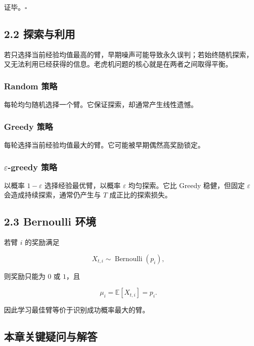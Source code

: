 \documentclass[
  11pt,
  a4paper,
]{ctexart}
\begin{document}
证毕。\(\square\)

\subsection{2.2 探索与利用}\label{ux63a2ux7d22ux4e0eux5229ux7528}

若只选择当前经验均值最高的臂，早期噪声可能导致永久误判；若始终随机探索，又无法利用已经获得的信息。老虎机问题的核心就是在两者之间取得平衡。

\subsubsection{Random 策略}\label{random-ux7b56ux7565}

每轮均匀随机选择一个臂。它保证探索，却通常产生线性遗憾。

\subsubsection{Greedy 策略}\label{greedy-ux7b56ux7565}

每轮选择当前经验均值最大的臂。它可能被早期偶然高奖励锁定。

\subsubsection{\texorpdfstring{\(\varepsilon\)-greedy
策略}{\textbackslash varepsilon-greedy 策略}}\label{varepsilon-greedy-ux7b56ux7565}

以概率 \(1-\varepsilon\) 选择经验最优臂，以概率 \(\varepsilon\)
均匀探索。它比 Greedy 稳健，但固定 \(\varepsilon\)
会造成持续探索，通常仍产生与 \(T\) 成正比的探索损失。

\subsection{2.3 Bernoulli 环境}\label{bernoulli-ux73afux5883}

若臂 \(i\) 的奖励满足

\[
X_{t,i}\sim\operatorname{Bernoulli}(p_i),
\]

则奖励只能为 \(0\) 或 \(1\)，且

\[
\mu_i=\mathbb E[X_{t,i}]=p_i.
\]

因此学习最佳臂等价于识别成功概率最大的臂。

\subsection{本章关键疑问与解答}\label{ux672cux7ae0ux5173ux952eux7591ux95ee-1}
\end{document}
